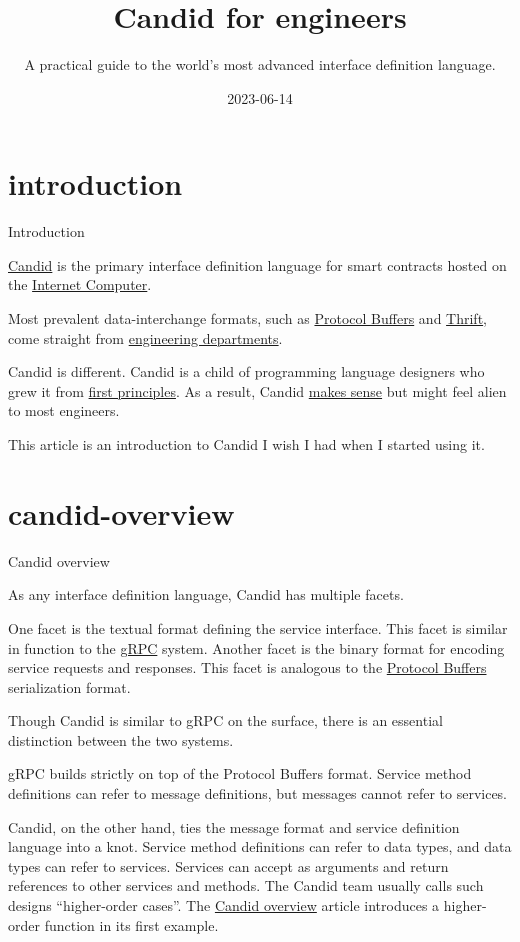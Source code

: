 \documentclass{article}
\title{Candid for engineers}
\subtitle{A practical guide to the world's most advanced interface definition language.}
\date{2023-06-14}
\begin{document}
\section{introduction}{Introduction}

\href{https://github.com/dfinity/candid}{Candid} is the primary interface definition language for smart contracts hosted on the \href{https://internetcomputer.org/}{Internet Computer}.

Most prevalent data-interchange formats, such as \href{https://protobuf.dev/}{Protocol Buffers} and \href{https://thrift.apache.org/}{Thrift}, come straight from \href{https://reasonablypolymorphic.com/blog/protos-are-wrong/#ad-hoc-and-built-by-amateurs}{engineering departments}.

Candid is different.
Candid is a child of programming language designers who grew it from \href{https://github.com/dfinity/candid/blob/master/spec/Candid.md#design-goals}{first principles}.
As a result, Candid \href{https://github.com/dfinity/candid/blob/master/spec/IDL-Soundness.md}{makes sense} but might feel alien to most engineers.

This article is an introduction to Candid I wish I had when I started using it.

\section{candid-overview}{Candid overview}

As any interface definition language, Candid has multiple facets.

One facet is the textual format defining the service interface.
This facet is similar in function to the \href{https://grpc.io/}{gRPC} system.
Another facet is the binary format for encoding service requests and responses.
This facet is analogous to the \href{https://protobuf.dev/}{Protocol Buffers} serialization format.

Though Candid is similar to gRPC on the surface, there is an essential distinction between the two systems.

gRPC builds strictly on top of the Protocol Buffers format.
Service method definitions can refer to message definitions, but messages cannot refer to services.

Candid, on the other hand, ties the message format and service definition language into a knot.
Service method definitions can refer to data types, and data types can refer to services.
Services can accept as arguments and return references to other services and methods.
The Candid team usually calls such designs ``higher-order cases''.
The \href{https://internetcomputer.org/docs/current/developer-docs/backend/candid/candid-concepts}{Candid overview} article introduces a higher-order function in its first example.
\end{document}
